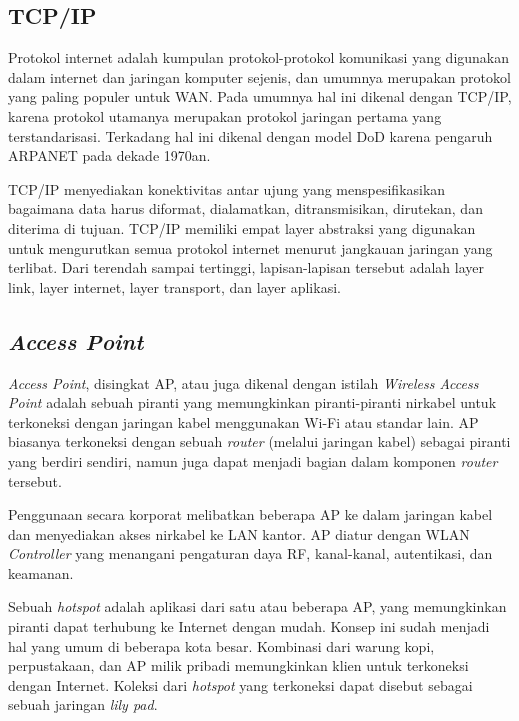   \subsection{TCP/IP}
    Protokol internet adalah kumpulan protokol-protokol komunikasi yang digunakan dalam internet dan jaringan komputer sejenis, dan umumnya merupakan protokol yang paling populer untuk WAN. Pada umumnya hal ini dikenal dengan TCP/IP, karena protokol utamanya merupakan protokol jaringan pertama yang terstandarisasi. Terkadang hal ini dikenal dengan model DoD karena pengaruh ARPANET pada dekade 1970an.

    TCP/IP menyediakan konektivitas antar ujung yang menspesifikasikan bagaimana data harus diformat, dialamatkan, ditransmisikan, dirutekan, dan diterima di tujuan. TCP/IP memiliki empat layer abstraksi yang digunakan untuk mengurutkan semua protokol internet menurut jangkauan jaringan yang terlibat. Dari terendah sampai tertinggi, lapisan-lapisan tersebut adalah layer link, layer internet, layer transport, dan layer aplikasi.

  \subsection{\emph{Access Point}}
    \emph{Access Point}, disingkat AP, atau juga dikenal dengan istilah \emph{Wireless Access Point} adalah sebuah piranti yang memungkinkan piranti-piranti nirkabel untuk terkoneksi dengan jaringan kabel menggunakan Wi-Fi atau standar lain. AP biasanya terkoneksi dengan sebuah \emph{router} (melalui jaringan kabel) sebagai piranti yang berdiri sendiri, namun juga dapat menjadi bagian dalam komponen \emph{router} tersebut.

    Penggunaan secara korporat melibatkan beberapa AP ke dalam jaringan kabel dan menyediakan akses nirkabel ke LAN kantor. AP diatur dengan WLAN \emph{Controller} yang menangani pengaturan daya RF, kanal-kanal, autentikasi, dan keamanan.
    
    Sebuah \emph{hotspot} adalah aplikasi dari satu atau beberapa AP, yang memungkinkan piranti dapat terhubung ke Internet dengan mudah. Konsep ini sudah menjadi hal yang umum di beberapa kota besar. Kombinasi dari warung kopi, perpustakaan, dan AP milik pribadi memungkinkan klien untuk terkoneksi dengan Internet. Koleksi dari \emph{hotspot} yang terkoneksi dapat disebut sebagai sebuah jaringan \emph{lily pad}.

